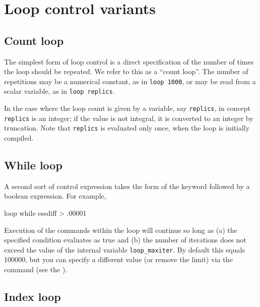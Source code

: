 
\section{Loop control variants}
\label{loop-control}

\subsection{Count loop}
\label{loop-count}

The simplest form of loop control is a direct specification of the
number of times the loop should be repeated.  We refer to this as a
``count loop''.  The number of repetitions may be a numerical
constant, as in \verb+loop 1000+, or may be read from a scalar
variable, as in \verb+loop replics+.

In the case where the loop count is given by a variable, say
\verb+replics+, in concept \verb+replics+ is an integer; if the value
is not integral, it is converted to an integer by truncation.  Note
that \verb+replics+ is evaluated only once, when the loop is initially
compiled.
      

\subsection{While loop}
\label{loop-while}

A second sort of control expression takes the form of the keyword
 followed by a boolean expression.  For example,
%
\begin{code}
loop while essdiff > .00001
\end{code}

Execution of the commands within the loop will continue so long as (a)
the specified condition evaluates as true and (b) the number of
iterations does not exceed the value of the internal variable
\verb|loop_maxiter|.  By default this equals 100000, but you can specify
a different value (or remove the limit) via the  command (see 
the \GCR).

\subsection{Index loop}
\label{loop-index}


